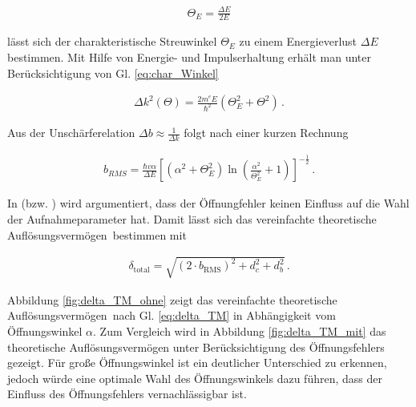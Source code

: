 \documentclass[
	paper=a4,				%
	twoside=true,			%
	BCOR=6mm,				%
	fontsize=12pt,			%
	pagesize=auto,			%
	numbers=noenddot,		%
	bibliography=totoc,		%
	draft=false
]{scrartcl}
\begin{document}
\begin{align}
\Theta_E = \frac{\Delta E}{2 E} \label{eq:char_Winkel}
\end{align}

lässt sich der charakteristische Streuwinkel $\Theta_E$ zu einem Energieverlust $\Delta E$ bestimmen. Mit Hilfe von Energie- und Impulserhaltung erhält man unter Berücksichtigung von Gl. \ref{eq:char_Winkel}

\begin{align}
\Delta k^2(\Theta) = \frac{2\si{\electronmass}E}{\hbar^2}\left( \Theta_E^2 + \Theta^2 \right)\,.
\end{align}

Aus der Unschärferelation $\Delta b \approx \frac{1}{\Delta k}$ folgt nach einer kurzen Rechnung \cite[Appendix]{pennycook_high_1982}

\begin{align}
b_{RMS} = \frac{\hbar v \alpha}{\Delta E} \left[\left(\alpha^2+\Theta_E^2\right)\ln\left(\frac{\alpha^2}{\Theta_E^2}+1\right)\right]^{-\frac{1}{2}}\,. \label{eq:Delokalisation}
\end{align}

In \cite{thomas_introduction_2002} (bzw. \cite{krivanek_spatial_1995}) wird argumentiert, dass der Öffnungfehler keinen Einfluss auf die Wahl der Aufnahmeparameter hat. Damit lässt sich das \glqq vereinfachte theoretische Auflösungsvermögen\grqq\ bestimmen mit

\begin{align}
\delta_\mathrm{total} = \sqrt{\left(2\cdot b_\mathrm{RMS}\right)^2 + d_c^2 + d_b^2}\,. \label{eq:delta_TM}
\end{align}

Abbildung \ref{fig:delta_TM_ohne} zeigt das \glqq vereinfachte theoretische Auflösungsvermögen\grqq\ nach Gl. \ref{eq:delta_TM} in Abhängigkeit vom Öffnungswinkel $\alpha$. Zum Vergleich wird in Abbildung \ref{fig:delta_TM_mit} das theoretische Auflösungsvermögen unter Berücksichtigung des Öffnungsfehlers gezeigt. Für große Öffnungswinkel ist ein deutlicher Unterschied zu erkennen, jedoch würde eine optimale Wahl des Öffnungswinkels dazu führen, dass der Einfluss des Öffnungsfehlers vernachlässigbar ist.
\end{document}
